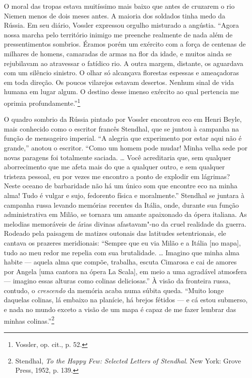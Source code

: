 O moral das tropas estava muitíssimo mais baixo que antes de cruzarem o
rio Niemen menos de dois meses antes. A maioria dos soldados tinha medo
da Rússia. Em seu diário, Vossler expressou orgulho misturado a
angústia. ``Agora nossa marcha pelo território inimigo me preenche
realmente de nada além de pressentimentos sombrios. Éramos porém um
exército com a força de centenas de milhares de homens, camaradas de
armas na flor da idade, e muitos ainda se rejubilavam ao atravessar o
fatídico rio. A outra margem, distante, os aguardava com um silêncio
sinistro. O olhar só alcançava florestas espessas e ameaçadoras em toda
direção. Os poucos vilarejos estavam desertos. Nenhum sinal de vida
humana em lugar algum. O destino desse imenso exército ao qual pertencia
me oprimia profundamente.''\footnote{Vossler, op. cit., p. 52.}

O quadro sombrio da Rússia pintado por Vossler encontrou eco em Henri
Beyle, mais conhecido como o escritor francês Stendhal, que se juntou à
campanha na função de mensageiro imperial. ``A alegria que experimento
por estar aqui não é grande,'' anotou o escritor. ``Como um homem pode
mudar! Minha velha sede por novas paragens foi totalmente saciada.
\ldots{} Você acreditaria que, sem qualquer aborrecimento que me afeta
mais do que a qualquer outro, e sem qualquer tristeza pessoal, eu por
vezes me encontro a ponto de explodir em lágrimas? Neste oceano de
barbaridade não há um único som que encontre eco na minha alma! Tudo é
vulgar e sujo, fedorento física e moralmente.'' Stendhal se juntara à
campanha russa levando memórias recentes da Itália, onde, durante sua
função administrativa em Milão, se tornara um amante apaixonado da ópera
italiana. As melodias memoráveis de árias divinas afastavam"-no da cruel
realidade da guerra. Rodeado pela paisagem de matizes outonais das
latitudes setentrionais, ele cantava os prazeres meridionais: ``Sempre
que eu via Milão e a Itália {[}no mapa{]}, tudo ao meu redor me repelia
com sua brutalidade. \ldots{} Imagino que minha alma habite --- aquela
alma que compõe, trabalha, escuta Cimarosa e cai de amores por Angela
{[}uma cantora na ópera La Scala{]}, em meio a uma agradável atmosfera ---
imagino essas alturas como colinas deliciosas.'' À visão da fronteira
russa, contudo, o \emph{crescendo} da memória acaba numa súbita queda.
``Muito longe daquelas colinas, lá embaixo na planície, há brejos
fétidos --- e cá estou submerso, e nada no mundo exceto a visão de um mapa
é capaz de me fazer lembrar das minhas colinas.''\footnote{Stendhal,
  \emph{To the Happy Few: Selected Letters of Stendhal}. New York: Grove
  Press, 1952, p. 139.}

